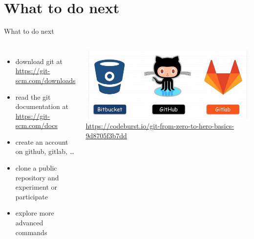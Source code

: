 \documentclass[10pt, graphics, aspectratio=169, table]{beamer}
\begin{document}
    \section{What to do next}
    \begin{frame}{What to do next}
        \begin{columns}
                \begin{itemize}
                    \item download git at \url{https://git-scm.com/downloads}
                    \item read the git documentation at \url{https://git-scm.com/docs}
                    \item create an account on github, gitlab, \ldots
                    \item clone a public repository and experiment or participate
                    \item explore more advanced commands
                \end{itemize}
                \center\includegraphics[scale=0.28]{img/hosting.png}
                \center\tiny\url{https://codeburst.io/git-from-zero-to-hero-basics-9d8705f3b7dd}
        \end{columns}
    \end{frame}
\end{document}
